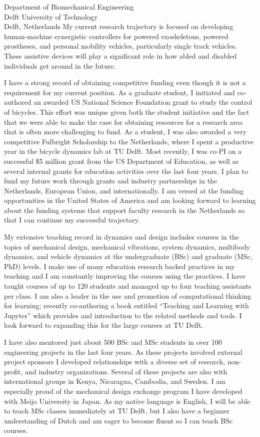 \documentclass{letter}
\begin{document}
\begin{letter}{
  Department of Biomechanical Engineering \\
  Delft University of Technology \\
  Delft, Netherlands
}
My current research trajectory is focused on developing human-machine
synergistic controllers for powered exoskeletons, powered prostheses, and
personal mobility vehicles, particularly single track vehicles. These assistive
devices will play a significant role in how abled and disabled individuals get
around in the future.

I have a strong record of obtaining competitive funding even though it is not a
requirement for my current position. As a graduate student, I initiated and
co-authored an awarded US National Science Foundation grant to study the
control of bicycles. This effort was unique given both the student initiative
and the fact that we were able to make the case for obtaining resources for a
research area that is often more challenging to fund. As a student, I was also
awarded a very competitive Fulbright Scholarship to the Netherlands, where I
spent a productive year in the bicycle dynamics lab at TU Delft. Most recently,
I was co-PI on a successful \$5 million grant from the US Department of
Education, as well as several internal grants for education activities over the
last four years. I plan to fund my future work through grants and industry
partnerships in the Netherlands, European Union, and internationally. I am
versed at the funding opportunities in the United States of America and am
looking forward to learning about the funding systems that support faculty
research in the Netherlands so that I can continue my successful trajectory.

My extensive teaching record in dynamics and design includes courses in the
topics of mechanical design, mechanical vibrations, system dynamics, multibody
dynamics, and vehicle dynamics at the undergraduate (BSc) and graduate (MSc,
PhD) levels. I make use of many education research backed practices in my
teaching and I am constantly improving the courses using the practices. I have
taught courses of up to 120 students and managed up to four teaching assistants
per class. I am also a leader in the use and promotion of computational
thinking for learning; recently co-authoring a book entitled ``Teaching and
Learning with Jupyter'' which provides and introduction to the related methods
and tools. I look forward to expanding this for the large courses at TU Delft.

I have also mentored just about 500 BSc and MSc students in over 100
engineering projects in the last four years. As these projects involved
external project sponsors I developed relationships with a diverse set of
research, non-profit, and industry organizations. Several of these projects are
also with international groups in Kenya, Nicaragua, Cambodia, and Sweden. I am
especially proud of the mechanical design exchange program I have developed
with Meijo University in Japan. As my native language is English, I will be
able to teach MSc classes immediately at TU Delft, but I also have a beginner
understanding of Dutch and am eager to become fluent so I can teach BSc
courses.


\end{letter}
\end{document}
